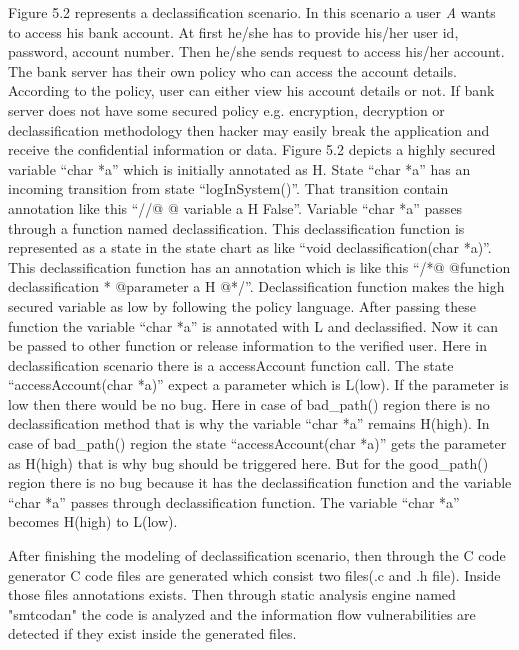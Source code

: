  Figure 5.2 represents a declassification scenario. In this scenario a user \emph{A} wants to access his bank account. At first he/she has to provide his/her user id, password, account number. Then he/she sends request to access his/her account. The bank server has their own policy who can access the account details. According to the policy, user can either view his account details or not. If bank server does not have some secured policy e.g. encryption, decryption or declassification methodology then hacker may easily break the application and receive the confidential information or data. Figure 5.2 depicts a highly secured variable \enquote{char *a} which is initially annotated as H. State \enquote{char *a} has an incoming transition from state \enquote{logInSystem()}. That transition contain annotation like this \enquote{//@ @ variable a H False}. Variable \enquote{char *a} passes through a function named declassification. This declassification function is represented as a state in the state chart as like \enquote{void declassification(char *a)}. This declassification function has an annotation which is like this \enquote{/*@ @function declassification * @parameter a H @*/}. Declassification function makes the high secured variable as low by following the policy language. After passing these function the variable \enquote{char *a} is annotated with L and declassified. Now it can be passed to other function or release information to the verified user. Here in declassification scenario there is a accessAccount function call. The state \enquote{accessAccount(char *a)} expect a parameter which is L(low). If the parameter is low then there would be no bug. Here in case of bad\_path() region there is no declassification method that is why the variable \enquote{char *a} remains H(high). In case of bad\_path() region the state \enquote{accessAccount(char *a)} gets the parameter as H(high) that is why bug should be triggered here. But for the good\_path() region there is no bug because it has the declassification function and the variable \enquote{char *a} passes through declassification function. The variable \enquote{char *a} becomes H(high) to L(low).
 
 After finishing the modeling of declassification scenario, then through the C code generator C code files are generated which consist two files(.c and .h file). Inside those files annotations exists. Then through static analysis engine named "smtcodan" the code is analyzed and the information flow vulnerabilities are  detected if they exist inside the generated files.
 
